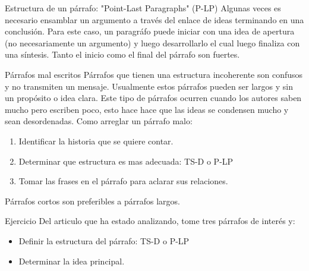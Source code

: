 \documentclass[
10pt,
aspectratio=169,
]{beamer}
\begin{document}
\begin{frame}[c]{Estructura de un p\'arrafo: \alert{"Point-Last Paragraphs" (P-LP)}}
Algunas veces es necesario ensamblar un argumento a trav\'es del enlace de ideas terminando en una conclusi\'on. Para este caso, un paragr\'afo puede iniciar con una idea de apertura (no necesariamente un argumento) y luego desarrollarlo el cual luego finaliza con una s\'intesis. Tanto el inicio como el final del p\'arrafo son fuertes. 
\end{frame}

\begin{frame}[c]{P\'arrafos mal escritos}
P\'arrafos que tienen una estructura incoherente son confusos y no transmiten un mensaje. Usualmente estos p\'arrafos pueden ser largos y sin un prop\'osito o idea clara. Este tipo de p\'arrafos ocurren cuando los autores saben mucho pero escriben poco, esto hace hace que las ideas se condensen mucho y sean desordenadas. 
Como arreglar un p\'arrafo malo:
\begin{enumerate}  
\item Identificar la historia que se quiere contar. 
\item Determinar que estructura es mas adecuada: TS-D o P-LP
\item Tomar las frases en el p\'arrafo para aclarar sus relaciones. 
\end{enumerate}  
P\'arrafos cortos son preferibles a p\'arrafos largos.
\end{frame}

\begin{frame}[c]{Ejercicio}
Del articulo que ha estado analizando, tome tres p\'arrafos de inter\'es y:
\begin{itemize}
\item Definir la estructura del p\'arrafo: TS-D o P-LP
\item Determinar la idea principal.
\end{itemize}
\end{frame}
\end{document}
